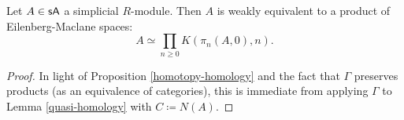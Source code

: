 \begin{proposition}
  Let $A \in \mathsf{s}\mathsf{A}$ a simplicial $R$-module. Then $A$ is weakly
  equivalent to a product of Eilenberg-Maclane spaces:
  \[
  A \simeq \prod_{n \ge 0} K(\pi_n(A,0),n).
  \]
\end{proposition}

\begin{proof}
  In light of Proposition \ref{homotopy-homology} and the fact that
  $\Gamma$ preserves products (as an equivalence of categories), this
  is immediate from applying $\Gamma$ to Lemma \ref{quasi-homology}
  with $C \coloneqq N(A)$.
\end{proof}


\nocite{goerssjardine, riehl-ssets, mathew-doldkan, weibel}




